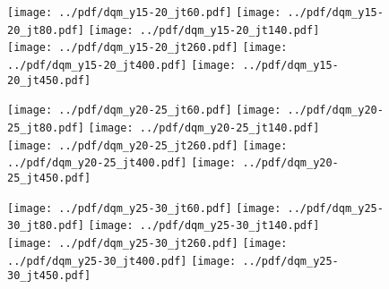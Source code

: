 \documentclass[landscape,10pt]{beamer} %
\begin{document}
\newpage

\begin{figure}[p]
\texttt{[image: ../pdf/dqm\_y15-20\_jt60.pdf]}
\texttt{[image: ../pdf/dqm\_y15-20\_jt80.pdf]}
\texttt{[image: ../pdf/dqm\_y15-20\_jt140.pdf]}\\
\texttt{[image: ../pdf/dqm\_y15-20\_jt260.pdf]}
\texttt{[image: ../pdf/dqm\_y15-20\_jt400.pdf]}
\texttt{[image: ../pdf/dqm\_y15-20\_jt450.pdf]}
\end{figure}

\newpage

\begin{figure}[p]
\texttt{[image: ../pdf/dqm\_y20-25\_jt60.pdf]}
\texttt{[image: ../pdf/dqm\_y20-25\_jt80.pdf]}
\texttt{[image: ../pdf/dqm\_y20-25\_jt140.pdf]}\\
\texttt{[image: ../pdf/dqm\_y20-25\_jt260.pdf]}
\texttt{[image: ../pdf/dqm\_y20-25\_jt400.pdf]}
\texttt{[image: ../pdf/dqm\_y20-25\_jt450.pdf]}
\end{figure}

\newpage

\begin{figure}[p]
\texttt{[image: ../pdf/dqm\_y25-30\_jt60.pdf]}
\texttt{[image: ../pdf/dqm\_y25-30\_jt80.pdf]}
\texttt{[image: ../pdf/dqm\_y25-30\_jt140.pdf]}\\
\texttt{[image: ../pdf/dqm\_y25-30\_jt260.pdf]}
\texttt{[image: ../pdf/dqm\_y25-30\_jt400.pdf]}
\texttt{[image: ../pdf/dqm\_y25-30\_jt450.pdf]}
\end{figure}
\end{document}
